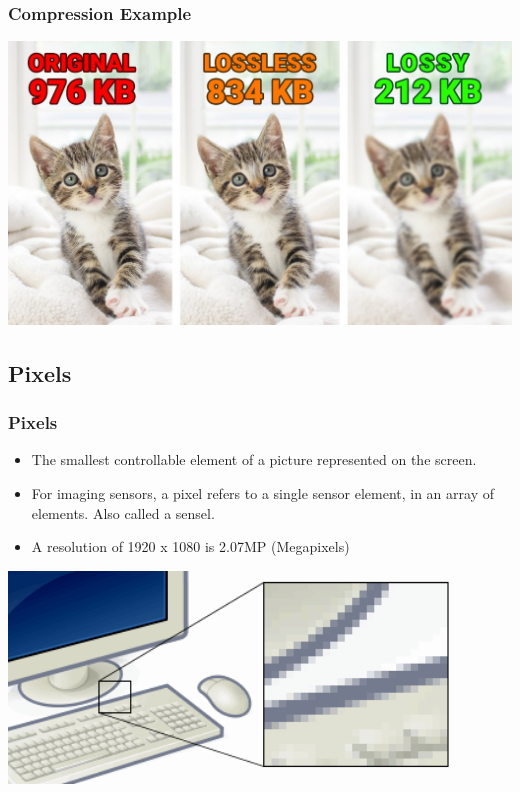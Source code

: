 \documentclass{beamer}
\begin{document}
		\begin{frame}
	\frametitle{Compression Example}
	
	\begin{center}
		\includegraphics[width = 1.0\textwidth]{images/maxresdefault.jpg}
	\end{center}
\end{frame}

\subsection{Pixels}
\begin{frame}
	\frametitle{Pixels}
	\begin{itemize}
		\item The smallest controllable element of a picture represented on the screen.  
		\item For imaging sensors, a pixel refers to a single sensor element, in an array of elements.  Also called a sensel.  
		\item A resolution of 1920 x 1080 is 2.07MP (Megapixels)
	\end{itemize}
	\begin{center}
		\includegraphics[width = 0.9\textwidth]{images/Pixel-example.png}
	\end{center}
\end{frame}
	
\end{document}
